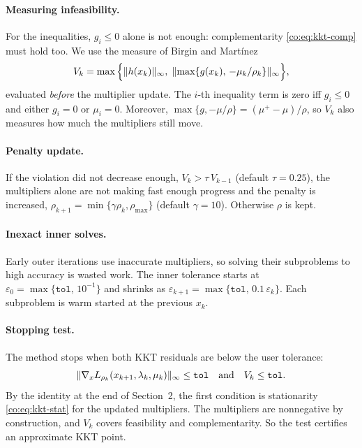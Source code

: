 \paragraph{Measuring infeasibility.}
For the inequalities, $g_i\le 0$ alone is not enough: complementarity
\eqref{co:eq:kkt-comp} must hold too. We use the measure of Birgin and
Mart\'inez~\cite{birgin2014}
\begin{equation}\label{co:eq:violation}
  V_k = \max\Big\{ \lVert h(x_k)\rVert_\infty,\;
                   \lVert \max\{g(x_k),\,-\mu_k/\rho_k\}\rVert_\infty \Big\},
\end{equation}
evaluated \emph{before} the multiplier update. The $i$-th inequality term is zero
iff $g_i\le 0$ and either $g_i=0$ or $\mu_i=0$. Moreover,
$\max\{g,-\mu/\rho\} = (\mu^+-\mu)/\rho$, so $V_k$ also measures how much the
multipliers still move.

\paragraph{Penalty update.}
If the violation did not decrease enough,
$V_k > \tau\, V_{k-1}$ (default $\tau=0.25$), the multipliers alone are not
making fast enough progress and the penalty is increased,
$\rho_{k+1}=\min\{\gamma\rho_k,\rho_{\max}\}$ (default $\gamma=10$).
Otherwise $\rho$ is kept.

\paragraph{Inexact inner solves.}
Early outer iterations use inaccurate multipliers, so solving their subproblems
to high accuracy is wasted work. The inner tolerance starts at
$\varepsilon_0 = \max\{\texttt{tol},\,10^{-1}\}$ and shrinks as
$\varepsilon_{k+1}=\max\{\texttt{tol},\,0.1\,\varepsilon_k\}$. Each subproblem is warm
started at the previous $x_k$.

\paragraph{Stopping test.}
The method stops when both KKT residuals are below the user tolerance:
\[
  \lVert \nabla_x L_{\rho_k}(x_{k+1},\lambda_k,\mu_k)\rVert_\infty \le \texttt{tol}
  \quad\text{and}\quad V_k \le \texttt{tol}.
\]
By the identity at the end of Section~2, the first condition is stationarity
\eqref{co:eq:kkt-stat} for the updated multipliers. The multipliers are
nonnegative by construction, and $V_k$ covers feasibility and complementarity.
So the test certifies an approximate KKT point.

